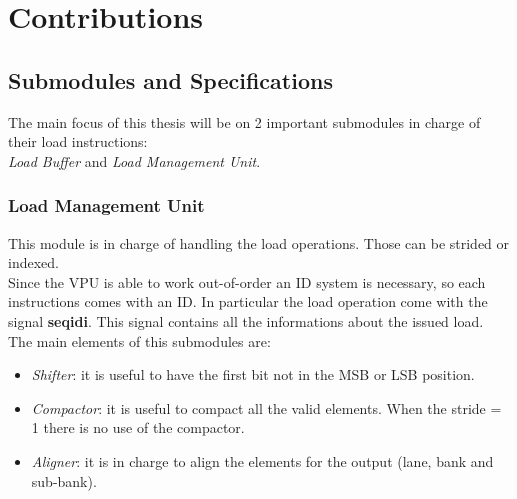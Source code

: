 \chapter{Contributions}
\section{Submodules and Specifications}


The main focus of this thesis will be on 2 important submodules in charge of their load instructions:\\

\textit{Load Buffer} and \textit{Load Management Unit}.

\subsection{Load Management Unit}


This module is in charge of handling the load operations.
Those can be strided or indexed.\\

Since the VPU is able to work out-of-order an ID system is necessary, so each instructions comes with an ID.
In particular the load operation come with the signal \textbf{seq\+id\+i}.
This signal contains all the informations about the issued load.\\

The main elements of this submodules are:
\begin{itemize}
    \item \textit{Shifter}: it is useful to have the first bit not in the MSB or LSB position.
    
    \item \textit{Compactor}: it is useful to compact all the valid elements. When the stride = 1 there is no use of the compactor.
    
    \item \textit{Aligner}: it is in charge to align the elements for the output (lane, bank and sub-bank).
\end{itemize}

\bigskip

